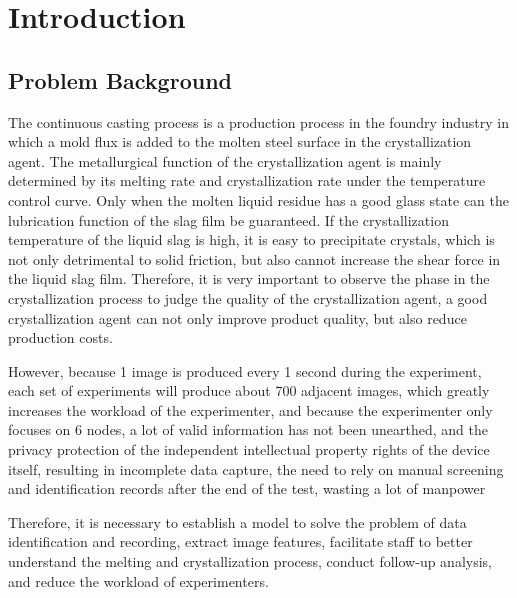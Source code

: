\documentclass[12pt]{apmcmthesis}
\begin{document}
\newpage
\tableofcontents


\newpage
\pagestyle{mainmatterstyle}
\setcounter{page}{1}
\section{Introduction}
\subsection{Problem Background}
The continuous casting process is a production process in the foundry industry in which a mold flux is added to the molten steel surface in the crystallization agent. The metallurgical function of the crystallization agent is mainly determined by its melting rate and crystallization rate under the temperature control curve. Only when the molten liquid residue has a good glass state can the lubrication function of the slag film be guaranteed. If the crystallization temperature of the liquid slag is high, it is easy to precipitate crystals, which is not only detrimental to solid friction, but also cannot increase the shear force in the liquid slag film. Therefore, it is very important to observe the phase in the crystallization process to judge the quality of the crystallization agent, a good crystallization agent can not only improve product quality, but also reduce production costs.

However, because 1 image is produced every 1 second during the experiment, each set of experiments will produce about 700 adjacent images, which greatly increases the workload of the experimenter, and because the experimenter only focuses on 6 nodes, a lot of valid information has not been unearthed, and the privacy protection of the independent intellectual property rights of the device itself, resulting in incomplete data capture, the need to rely on manual screening and identification records after the end of the test, wasting a lot of manpower

Therefore, it is necessary to establish a model to solve the problem of data identification and recording, extract image features, facilitate staff to better understand the melting and crystallization process, conduct follow-up analysis, and reduce the workload of experimenters.
\end{document}
